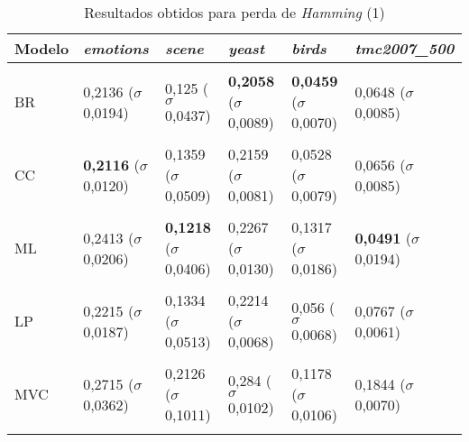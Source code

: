 
\begin{table}[htbp]
	\centering
	\caption{Resultados obtidos para perda de \textit{{Hamming}} (1)}
		\begin{tabular}
        { p{0.88in} p{0.88in} p{0.88in} p{0.88in} p{0.88in} p{0.88in} }
        
        \hline
Modelo & \textit{emotions} & \textit{scene} & \textit{yeast} & \textit{birds} & \textit{tmc2007\_500} \\ 
\hline \\

BR & 0,2136 \newline ($\sigma$ 0,0194) & 0,125 \newline ($\sigma$ 0,0437) & \textbf{0,2058} \newline ($\sigma$ 0,0089) & \textbf{0,0459} \newline ($\sigma$ 0,0070) & 0,0648 \newline ($\sigma$ 0,0085) \\ \\
CC & \textbf{0,2116} \newline ($\sigma$ 0,0120) & 0,1359 \newline ($\sigma$ 0,0509) & 0,2159 \newline ($\sigma$ 0,0081) & 0,0528 \newline ($\sigma$ 0,0079) & 0,0656 \newline ($\sigma$ 0,0085) \\ \\
ML & 0,2413 \newline ($\sigma$ 0,0206) & \textbf{0,1218} \newline ($\sigma$ 0,0406) & 0,2267 \newline ($\sigma$ 0,0130) & 0,1317 \newline ($\sigma$ 0,0186) & \textbf{0,0491} \newline ($\sigma$ 0,0194) \\ \\
LP & 0,2215 \newline ($\sigma$ 0,0187) & 0,1334 \newline ($\sigma$ 0,0513) & 0,2214 \newline ($\sigma$ 0,0068) & 0,056 \newline ($\sigma$ 0,0068) & 0,0767 \newline ($\sigma$ 0,0061) \\ \\
MVC & 0,2715 \newline ($\sigma$ 0,0362) & 0,2126 \newline ($\sigma$ 0,1011) & 0,284 \newline ($\sigma$ 0,0102) & 0,1178 \newline ($\sigma$ 0,0106) & 0,1844 \newline ($\sigma$ 0,0070) \\ \\

\end{tabular}
\end{table}
